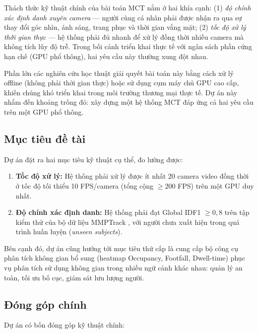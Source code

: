 \documentclass{article} %
\begin{document}
Thách thức kỹ thuật chính của bài toán MCT nằm ở hai khía cạnh: (1) \textit{độ chính xác định danh xuyên camera} --- người cùng cá nhân phải được nhận ra qua sự thay đổi góc nhìn, ánh sáng, trang phục và thời gian vắng mặt; (2) \textit{tốc độ xử lý thời gian thực} --- hệ thống phải đủ nhanh để xử lý đồng thời nhiều camera mà không tích lũy độ trễ. Trong bối cảnh triển khai thực tế với ngân sách phần cứng hạn chế (GPU phổ thông), hai yêu cầu này thường xung đột nhau.

Phần lớn các nghiên cứu học thuật giải quyết bài toán này bằng cách xử lý offline (không phải thời gian thực) hoặc sử dụng cụm máy chủ GPU cao cấp, khiến chúng khó triển khai trong môi trường thương mại thực tế. Dự án này nhắm đến khoảng trống đó: xây dựng một hệ thống MCT đáp ứng cả hai yêu cầu trên một GPU phổ thông.

\subsection{Mục tiêu đề tài}

Dự án đặt ra hai mục tiêu kỹ thuật cụ thể, đo lường được:

\begin{enumerate}
    \item \textbf{Tốc độ xử lý:} Hệ thống phải xử lý được ít nhất 20 camera video đồng thời ở tốc độ tối thiểu 10 FPS/camera (tổng cộng $\geq 200$ FPS) trên một GPU duy nhất.

    \item \textbf{Độ chính xác định danh:} Hệ thống phải đạt Global IDF1 $\geq 0{,}8$ trên tập kiểm thử của bộ dữ liệu MMPTrack \cite{Han2022}, với người chưa xuất hiện trong quá trình huấn luyện (\textit{unseen subjects}).
\end{enumerate}

Bên cạnh đó, dự án cũng hướng tới mục tiêu thứ cấp là cung cấp bộ công cụ phân tích không gian bổ sung (heatmap Occupancy, Footfall, Dwell-time) phục vụ phân tích sử dụng không gian trong nhiều ngữ cảnh khác nhau: quản lý an toàn, tối ưu bố cục, giám sát lưu lượng người.

\subsection{Đóng góp chính}

Dự án có bốn đóng góp kỹ thuật chính:
\end{document}
